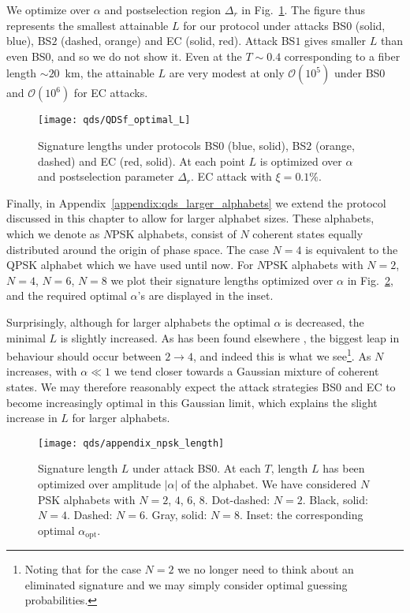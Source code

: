 We optimize over $\alpha$ and postselection region $\Delta_r$ in Fig.~\ref{fig:qds_optimal_L}. The figure thus represents the smallest attainable $L$ for our protocol under attacks BS$0$ (solid, blue), BS$2$ (dashed, orange) and EC (solid, red). Attack BS$1$ gives smaller $L$ than even BS$0$, and so we do not show it. Even at the $T \sim 0.4$ corresponding to a fiber length $\sim 20$~km, the attainable $L$ are very modest at only $\mathcal{O}\left(10^5\right)$ under BS$0$ and $\mathcal{O}\left(10^6\right)$ for EC attacks. 


\begin{figure}[htp]
\captionsetup{width=0.8\linewidth}
\centering
\texttt{[image: qds/QDSf\_optimal\_L]}
\caption{\label{fig:qds_optimal_L} Signature lengths under protocols BS$0$ (blue, solid), BS$2$ (orange, dashed) and EC (red, solid). At each point $L$ is optimized over $\alpha$ and postselection parameter $\Delta_r$. EC attack with $\xi = 0.1\%$.}
\end{figure}

Finally, in Appendix~\ref{appendix:qds_larger_alphabets} we extend the protocol discussed in this chapter to allow for larger alphabet sizes. These alphabets, which we denote as $N$PSK alphabets, consist of $N$ coherent states equally distributed around the origin of phase space. The case $N=4$ is equivalent to the QPSK alphabet which we have used until now. For $N$PSK alphabets with $N=2$, $N=4$, $N=6$, $N=8$ we plot their signature lengths optimized over $\alpha$ in Fig.~\ref{fig:qds_npsk_length_body}, and the required optimal $\alpha$'s are displayed in the inset. 

Surprisingly, although for larger alphabets the optimal $\alpha$ is decreased, the minimal $L$ is slightly increased. As has been found elsewhere \cite{Leverrier2011}, the biggest leap in behaviour should occur between $2 \rightarrow 4$, and indeed this is what we see\footnote{Noting that for the case $N=2$ we no longer need to think about an eliminated signature and we may simply consider optimal guessing probabilities.}. As $N$ increases, with $\alpha \ll 1$ we tend closer towards a Gaussian mixture of coherent states. We may therefore reasonably expect the attack strategies BS$0$ and EC to become increasingly optimal in this Gaussian limit, which explains the slight increase in $L$ for larger alphabets.

\begin{figure}[htp]
\captionsetup{width=0.8\linewidth}
\centering
\texttt{[image: qds/appendix\_npsk\_length]}
\caption{\label{fig:qds_npsk_length_body} Signature length $L$ under attack BS$0$. At each $T$, length $L$ has been optimized over amplitude $\left|\alpha\right|$ of the alphabet. We have considered $N$PSK alphabets with $N = 2$, $4$, $6$, $8$. Dot-dashed: $N=2$. Black, solid: $N = 4$. Dashed: $N = 6$. Gray, solid: $N = 8$. Inset: the corresponding optimal $\alpha_{\text{opt}}$. } %
\end{figure}

